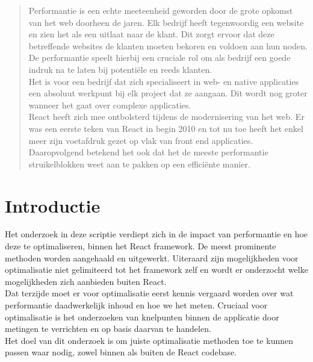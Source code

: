 \documentclass[a0,portrait]{a0poster}
\begin{document}
\begin{multicols}{2} %


\color{HoGentAccent1} %

\begin{abstract}
Performantie is een echte meeteenheid geworden door de grote opkomst van het web doorheen de jaren. Elk bedrijf heeft tegenwoordig een website en zien het als een uitlaat naar de klant. Dit zorgt ervoor dat deze betreffende websites de klanten moeten bekoren en voldoen aan hun noden. De performantie speelt hierbij een cruciale rol om als bedrijf een goede indruk na te laten bij potentiële en reeds klanten. \\
Het is voor een bedrijf dat zich specialiseert in web- en native applicaties een absoluut werkpunt bij elk project dat ze aangaan. Dit wordt nog groter wanneer het gaat over complexe applicaties. \\
React heeft zich mee ontbolsterd tijdens de modernisering van het web. Er was een eerste teken van React in begin 2010 en tot nu toe heeft het enkel meer zijn voetafdruk gezet op vlak van front end applicaties. Daaropvolgend betekend het ook dat het de meeste performantie struikelblokken weet aan te pakken op een efficiënte manier.
\end{abstract}

\color{HoGentAccent1} 
\section*{Introductie}
\color{black}
\color{black}
Het onderzoek in deze scriptie verdiept zich in de impact van performantie en hoe deze te optimaliseren, binnen het React framework. De meest prominente methoden worden aangehaald en uitgewerkt. Uiteraard zijn mogelijkheden voor optimalisatie niet gelimiteerd tot het framework zelf en wordt er onderzocht welke mogelijkheden zich aanbieden buiten React. \\
Dat terzijde moet er voor optimalisatie eerst kennis vergaard worden over wat performantie daadwerkelijk inhoud en hoe we het meten. Cruciaal voor optimalisatie is het onderzoeken van knelpunten binnen de applicatie door metingen te verrichten en op basis daarvan te handelen. \\
Het doel van dit onderzoek is om juiste optimalisatie methoden toe te kunnen passen waar nodig, zowel binnen als buiten de React codebase.


\end{multicols}
\end{document}
